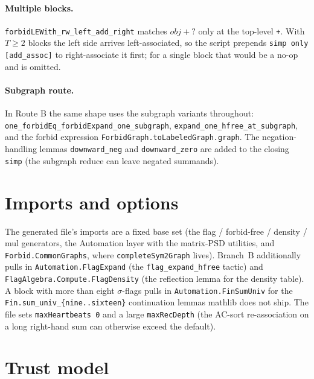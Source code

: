 \documentclass[11pt]{article}
\begin{document}
\paragraph{Multiple blocks.}
\texttt{forbidLEWith\_rw\_left\_add\_right} matches $\mathit{obj} + \texttt{?}$
only at the top-level \texttt{+}. With $T\ge 2$ blocks the left side arrives
left-associated, so the script prepends \texttt{simp only [add\_assoc]} to
right-associate it first; for a single block that would be a no-op and is
omitted.

\paragraph{Subgraph route.}
In Route B the same shape uses the subgraph variants throughout:
\texttt{one\_forbidEq\_forbidExpand\_one\_subgraph},
\texttt{expand\_one\_hfree\_at\_subgraph}, and the forbid expression
\texttt{ForbidGraph.toLabeledGraph.graph}. The negation-handling lemmas
\texttt{downward\_neg} and \texttt{downward\_zero} are added to the closing
\texttt{simp} (the subgraph reduce can leave negated summands).

\section{Imports and options}

The generated file's imports are a fixed base set (the flag / forbid-free /
density / mul generators, the Automation layer with the matrix-PSD utilities, and
\texttt{Forbid.CommonGraphs}, where \texttt{completeSym2Graph} lives). Branch~B
additionally pulls in \texttt{Automation.FlagExpand} (the
\texttt{flag\_expand\_hfree} tactic) and \texttt{FlagAlgebra.Compute.FlagDensity}
(the reflection lemma for the density table). A block with more than eight
$\sigma$-flags pulls in \texttt{Automation.FinSumUniv} for the
\texttt{Fin.sum\_univ\_\{nine..sixteen\}} continuation lemmas mathlib does not
ship. The file sets \texttt{maxHeartbeats 0} and a large \texttt{maxRecDepth}
(the AC-sort re-association on a long right-hand sum can otherwise exceed the
default).

\section{Trust model}
\label{sec:trust}
\end{document}
